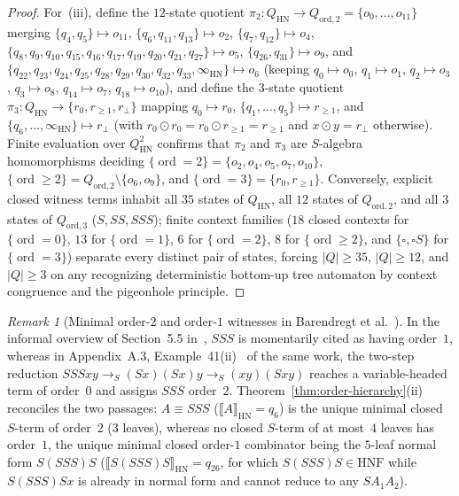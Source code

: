 \documentclass[11pt,reqno]{amsart}
\numberwithin{equation}{section}
\theoremstyle{plain}
\theoremstyle{definition}
\theoremstyle{remark}
\newtheorem{remark}[theorem]{Remark}
\DeclareMathOperator{\ord}{ord}
\newcommand{\HNF}{\mathrm{HNF}}
\newcommand{\HN}{\mathrm{HN}}
\newcommand{\sem}[1]{\llbracket #1 \rrbracket}
\newcommand{\redS}{\to_S}
\begin{document}
\begin{proof}
For~(iii), define the $12$-state quotient $\pi_2 \colon Q_{\HN} \to Q_{\mathrm{ord},2} = \{o_0, \dots, o_{11}\}$ merging $\{q_4, q_5\} \mapsto o_{11}$, $\{q_6, q_{11}, q_{13}\} \mapsto o_2$, $\{q_7, q_{12}\} \mapsto o_4$, $\{q_8, q_9, q_{10}, q_{15}, q_{16}, q_{17}, q_{19}, q_{20}, q_{21}, q_{27}\} \mapsto o_5$, $\{q_{26}, q_{31}\} \mapsto o_9$, and $\{q_{22}, q_{23}, q_{24}, q_{25}, q_{28}, q_{29}, q_{30}, q_{32}, q_{33}, \infty_{\HN}\} \mapsto o_6$ (keeping $q_0 \mapsto o_0$, $q_1 \mapsto o_1$, $q_2 \mapsto o_3$, $q_3 \mapsto o_8$, $q_{14} \mapsto o_7$, $q_{18} \mapsto o_{10}$), and define the $3$-state quotient $\pi_3 \colon Q_{\HN} \to \{r_0, r_{\ge 1}, r_\bot\}$ mapping $q_0 \mapsto r_0$, $\{q_1, \dots, q_5\} \mapsto r_{\ge 1}$, and $\{q_6, \dots, \infty_{\HN}\} \mapsto r_\bot$ (with $r_0 \odot r_0 = r_0 \odot r_{\ge 1} = r_{\ge 1}$ and $x \odot y = r_\bot$ otherwise). Finite evaluation over $Q_{\HN}^2$ confirms that $\pi_2$ and $\pi_3$ are $S$-algebra homomorphisms deciding $\{\ord = 2\} = \{o_2, o_4, o_5, o_7, o_{10}\}$, $\{\ord \ge 2\} = Q_{\mathrm{ord},2} \setminus \{o_6, o_9\}$, and $\{\ord = 3\} = \{r_0, r_{\ge 1}\}$. Conversely, explicit closed witness terms inhabit all $35$ states of $Q_{\HN}$, all $12$ states of $Q_{\mathrm{ord},2}$, and all $3$ states of $Q_{\mathrm{ord},3}$ ($S, S S, S S S$); finite context families ($18$ closed contexts for $\{\ord = 0\}$, $13$ for $\{\ord = 1\}$, $6$ for $\{\ord = 2\}$, $8$ for $\{\ord \ge 2\}$, and $\{\square, \square S\}$ for $\{\ord = 3\}$) separate every distinct pair of states, forcing $|Q| \ge 35$, $|Q| \ge 12$, and $|Q| \ge 3$ on any recognizing deterministic bottom-up tree automaton by context congruence and the pigeonhole principle.
\end{proof}

\begin{remark}[Minimal order-$2$ and order-$1$ witnesses in Barendregt et al.\ {\cite{BarendregtEndrullisKlopWaldmann2017}}]\label{rem:order-starlings-p90}
In the informal overview of Section~5.5 in~\cite[p.~90]{BarendregtEndrullisKlopWaldmann2017}, $S S S$ is momentarily cited as having order~$1$, whereas in Appendix~A.3, Example~41(ii)~\cite[p.~102]{BarendregtEndrullisKlopWaldmann2017} of the same work, the two-step reduction $S S S x y \redS (S x)(S x) y \redS (x y)(S x y)$ reaches a variable-headed term of order~$0$ and assigns $S S S$ order~$2$. Theorem~\ref{thm:order-hierarchy}(ii) reconciles the two passages: $A \equiv S S S$ ($\sem{A}_{\HN} = q_6$) is the unique minimal closed $S$-term of order~$2$ ($3$ leaves), whereas no closed $S$-term of at most~$4$ leaves has order~$1$, the unique minimal closed order-$1$ combinator being the $5$-leaf normal form $S(S S S)S$ ($\sem{S(S S S)S}_{\HN} = q_{26}$, for which $S(S S S)S \in \HNF$ while $S(S S S)S x$ is already in normal form and cannot reduce to any $S A_1 A_2$).
\end{remark}
\end{document}
